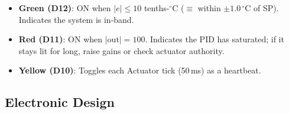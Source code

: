\documentclass[12pt]{article}
\begin{document}
\begin{itemize}
  \item \textbf{Green (D12)}: ON when $|e| \le 10$ tenths-$^{\circ}$C ($\equiv$ within $\pm 1.0\,^{\circ}$C of SP). Indicates the system is in-band.
  \item \textbf{Red (D11)}: ON when $|\mathrm{out}| = 100$. Indicates the PID has saturated; if it stays lit for long, raise gains or check actuator authority.
  \item \textbf{Yellow (D10)}: Toggles each Actuator tick (50\,ms) as a heartbeat.
\end{itemize}

\subsection{Electronic Design}
\end{document}
